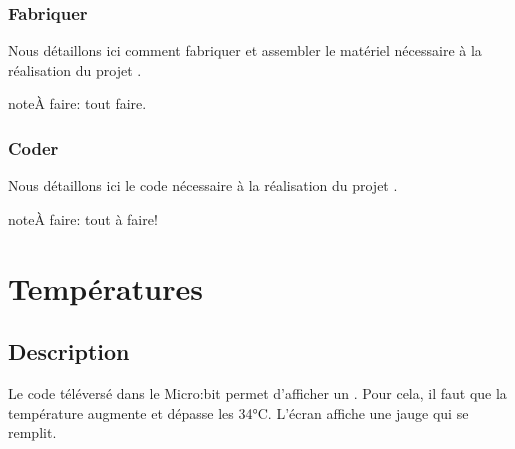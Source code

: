 \documentclass[letterpaper,10pt,french]{sphinxmanual}
\begin{document}
\subsubsection{Fabriquer}
\label{\detokenize{projets/pierrot-fabriquer::doc}}\label{\detokenize{projets/pierrot-fabriquer:fabriquer}}
Nous détaillons ici comment fabriquer et assembler
le matériel nécessaire à la réalisation du projet
{\hyperref[\detokenize{projets/pierrot:projetpierrot}]{}}.

\begin{sphinxadmonition}{note}{\label{projets/pierrot-fabriquer:index-0}À faire:}
tout faire.
\end{sphinxadmonition}

\ignorespaces 

\subsubsection{Coder}
\label{\detokenize{projets/pierrot-coder:index-0}}\label{\detokenize{projets/pierrot-coder:coder}}\label{\detokenize{projets/pierrot-coder::doc}}
Nous détaillons ici le code nécessaire à la réalisation
du projet {\hyperref[\detokenize{projets/pierrot:projetpierrot}]{}}.

\begin{sphinxadmonition}{note}{\label{projets/pierrot-coder:index-1}À faire:}
tout à faire!
\end{sphinxadmonition}


\section{Températures}
\label{\detokenize{projets/temperature:projettemp}}\label{\detokenize{projets/temperature::doc}}\label{\detokenize{projets/temperature:temperatures}}

\subsection{Description}
\label{\detokenize{projets/temperature:description}}
\noindent{}

Le code téléversé dans le Micro:bit permet d’afficher un .
Pour cela, il faut que la température augmente et
dépasse les 34°C. L’écran affiche une jauge qui se remplit.
\end{document}
